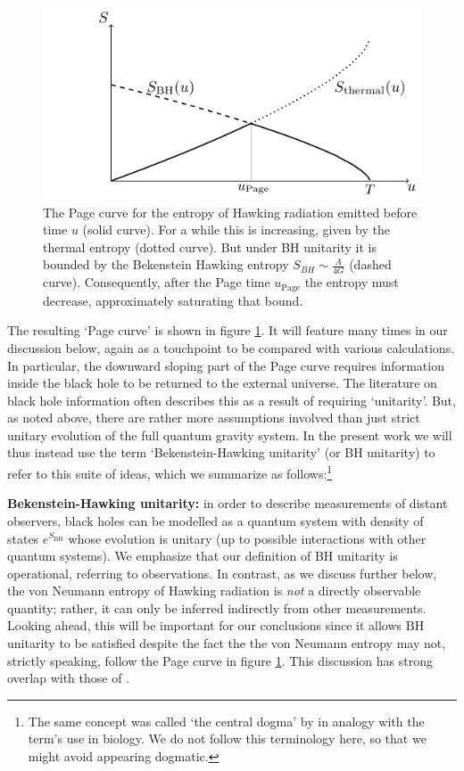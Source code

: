 \documentclass[letterpaper,12pt]{article}
\newenvironment{emphblock}%
  {\list{}{\leftmargin=0.22in\rightmargin=0.3in}\item[]}%
  {\endlist}
\begin{document}
\begin{figure}
	\centering
	\includegraphics[width=.6\textwidth]{PageCurve}
	\caption{The Page curve for the entropy of Hawking radiation emitted before time $u$ (solid curve). For a while this is increasing, given by the thermal entropy (dotted curve). But under BH unitarity it is bounded by the Bekenstein Hawking entropy $S_{BH}\sim \frac{A}{4G}$ (dashed curve). Consequently, after the Page time $u_\mathrm{Page}$ the entropy must decrease, approximately saturating that bound. \label{fig:Page}}
\end{figure}


The resulting `Page curve' is shown in figure \ref{fig:Page}.  It will feature many times in our discussion below, again as a touchpoint to be compared with various calculations. In particular, the downward sloping part of the Page curve requires information inside the black hole to be returned to the external universe.  The literature on black hole information often describes this as a result of requiring `unitarity'.   But, as noted above, there are rather more assumptions involved than just strict unitary evolution of the full quantum gravity system.  In the present work we will thus instead use the term `Bekenstein-Hawking unitarity' (or BH unitarity) to refer to this suite of ideas, which we summarize as follows:\footnote{The same concept was called `the central dogma' by \cite{Almheiri:2020cfm} in analogy with the term's use in biology. We do not follow this terminology here, so that we might avoid appearing dogmatic.}
\begin{emphblock}
	\textbf{Bekenstein-Hawking unitarity:} in order to describe measurements of distant observers, black holes can be modelled as a quantum system with density of states $e^{S_\mathrm{BH}}$ whose evolution is unitary (up to possible interactions with other quantum systems).
\end{emphblock}
We emphasize that our definition of BH unitarity is operational, referring to observations. In contrast, as we discuss further below, the von Neumann entropy of Hawking radiation is \emph{not} a directly observable quantity; rather, it can only be inferred indirectly from other measurements. Looking ahead, this will be important for our conclusions since it allows BH unitarity to be satisfied despite the fact the the von Neumann entropy may not, strictly speaking, follow the Page curve in figure \ref{fig:Page}.   This discussion has strong overlap with those of \cite{Coleman:1988cy,Giddings:1988cx,Giddings:1988wv,Polchinski:1994zs}.
\end{document}
